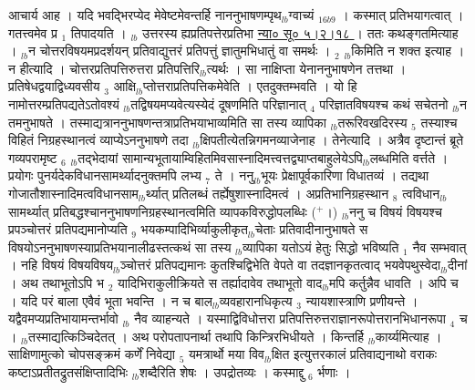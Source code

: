 \documentclass[article,12pt,a4paper]{memoir}%
\newcommand{\add}[1]{($^{+}$#1)}
\begin{document}
	  
	  \pstart \leavevmode%
	\hphantom{.}{\color{DodgerBlue3}आचार्य आह । यदि भवद्भिरप्ये}द {\color{DodgerBlue3}मेवेष्टमेवन्तर्हि नाननुभाषणम्पृथ{\tiny $_{lb}$}ग्वाच्यं} {\tiny $_{16b9}$} । कस्मात् प्रतिभयागत्वात् । गतत्त्वमेव प्र {\tiny $_{1}$} तिपादयति । {\tiny $_{lb}$} उत्तरस्य ह्यप्रतिपत्तेरप्रतिभा \href{http://sarit.indology.info/?cref=ns\%C5\%AB.5.2.18}{न्या० सू० ५।२।१८ } । ततः कथङ्गतमित्याह । {\tiny $_{lb}$}न {\color{DodgerBlue3}चोत्तरविषयमप्रदर्शयन्} प्रतिवाद्युत्तरं प्रतिपत्तुं ज्ञातुमभिधातुं वा समर्थः । {\tiny $_{2}$} {\tiny $_{lb}$}किमिति न शक्त इत्याह । न {\color{DodgerBlue3}हीत्यादि} । चोत्तरप्रतिपत्तिरुत्तरा प्रतिपत्तिरि{\tiny $_{lb}$}त्यर्थः । सा नाक्षिप्ता येनाननुभाषणेन तत्तथा । प्रतिषेधद्वयाद्विध्यवसीय {\tiny $_{3}$} आक्षि{\tiny $_{lb}$}प्तोत्तराप्रतिपत्तिकमेवेति । एतदुक्तम्भवति । यो हि नामोत्तरम्प्रतिपद्यतेऽतोवश्यं {\tiny $_{lb}$}तद्विषयमप्यवेत्यस्येदं दूषणमिति परिज्ञानात् {\tiny $_{4}$} परिज्ञातविषयश्च कथं सचेतनो {\tiny $_{lb}$}न तमनुभाषते । तस्माद्यत्राननुभाषणन्तत्राप्रतिभयाभाव्यमिति सा तस्य व्यापिका {\tiny $_{lb}$}तरूरिवखदिरस्य {\tiny $_{5}$} तस्याश्च विहितं निग्रहस्थानत्वं व्याप्येऽननुभाषणे तदा {\tiny $_{lb}$}क्षिपतीत्येतन्निगमनव्याजेनाह । {\color{DodgerBlue3}तेनेत्यादि} । अत्रैव दृष्टान्तं ब्रूते गव्यपरामृष्ट {\tiny $_{6}$} {\tiny $_{lb}$}तद्भेदायां सामान्यभूतायाम्विहितमिवसास्नादिमत्त्वत्तद्व्याप्तबाहुलेयेऽपि{\tiny $_{lb}$}लब्धमिति वर्त्तते । प्रयोगः पुनर्यदेकविधानसामर्थ्यादनुक्तमपि लभ्य {\tiny $_{7}$} ते । ननु{\tiny $_{lb}$}भूयः प्रेक्षापूर्वकारिणा विधातव्यं । तद्यथा गोजातौशास्नादिमत्वविधानसाम{\tiny $_{lb}$}र्थ्यात् प्रतिलब्धं तर्ह्येषुशास्नादिमत्वं । अप्रतिभानिग्रहस्थान {\tiny $_{8}$} त्वविधान{\tiny $_{lb}$}सामर्थ्यात् प्रतिबद्धश्चाननुभाषणनिग्रहस्थानत्वमिति व्यापकविरुद्धोपलब्धिः \add{।} {\tiny $_{lb}$}ननु च विषयं विषयश्च प्रपञ्चोत्तरं प्रतिपद्यमानोप्यति {\tiny $_{9}$} \leavevmode{} भयकम्पादिभिर्व्याकुलीकृत{\tiny $_{lb}$}चेताः प्रतिवादीनानुभाषते स विषयोऽननुभाषणस्याप्रतिभयानालीढस्तत्कथं सा तस्य {\tiny $_{lb}$}व्यापिका यतोऽयं हेतुः सिद्धो भविष्यति {\tiny $_{1}$} नैव सम्भवात् । नहि विषयं विषयविषय{\tiny $_{lb}$}ञ्चोत्तरं प्रतिपद्यमानः कुतश्चिद्विभेति वेपते वा तदज्ञानकृतत्वाद् भयवेपथुस्वेदा{\tiny $_{lb}$}दीनां । अथ तथाभूतोऽपि भ {\tiny $_{2}$} यादिभिराकुलीक्रियते स तर्ह्यादावेव तथाभूतो वाद{\tiny $_{lb}$}मपि कर्तुन्नैव धावति । अपि च । यदि परं बाला एवैवं भूता भवन्ति । न च बाल{\tiny $_{lb}$}व्यवहारानधिकृत्य {\tiny $_{3}$} न्यायशास्त्राणि प्रणीयन्ते । यद्वैवमप्यप्रतिभायामन्तर्भावो {\tiny $_{lb}$} \leavevmode{} नैव व्याहन्यते । यस्माद्विविधोत्तरा प्रतिपत्तिरुत्तराज्ञानरूपोत्तरानभिधानरूपा {\tiny $_{4}$} च । {\tiny $_{lb}$}तस्माद्यत्किञ्चिदेतत् । अथ परोपतापनार्था तथापि किन्त्रिरभिधीयते । किन्तर्हि {\tiny $_{lb}$}कार्य्यमित्याह । {\color{DodgerBlue3}साक्षिणामुत्को} चोपसङ्क्रमं कर्णें निवेद्या {\tiny $_{5}$} यमत्रार्थो मया विव{\tiny $_{lb}$}क्षित इत्युत्तरकालं प्रतिवाद्यनाथो वराकः कष्टाऽप्रतीतद्रुतसंक्षिप्तादिभिः {\tiny $_{lb}$}शब्दैरिति शेषः । उपद्रोतव्यः । कस्माद्दु {\tiny $_{6}$} र्भणाः । 
\end{document}
